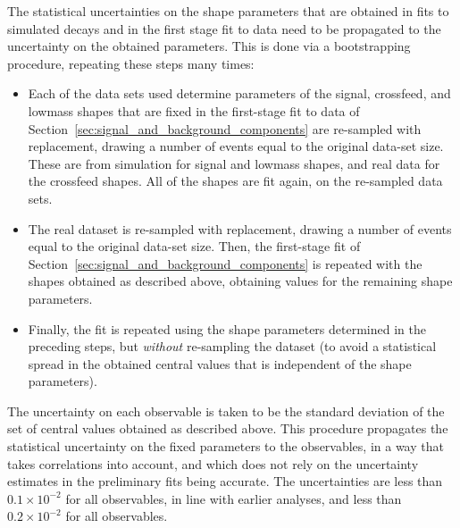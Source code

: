 The statistical uncertainties on the shape parameters that are obtained in fits to simulated decays and in the first stage fit to data need to be propagated to the uncertainty on the obtained parameters. This is done via a bootstrapping procedure, repeating these steps many times:
\begin{itemize}
    \item Each of the data sets used determine parameters of the signal, crossfeed, and lowmass shapes that are fixed in the first-stage fit to data of Section~\ref{sec:signal_and_background_components} are re-sampled with replacement, drawing a number of events equal to the original data-set size. These are from simulation for signal and lowmass shapes, and real data for the crossfeed shapes. All of the shapes are fit again, on the re-sampled data sets.
    \item The real dataset is re-sampled with replacement, drawing a number of events equal to the original data-set size. Then, the first-stage fit of Section~\ref{sec:signal_and_background_components} is repeated with the shapes obtained as described above, obtaining values for the remaining shape parameters.
    \item Finally, the \CP fit is repeated using the shape parameters determined in the preceding steps, but \emph{without} re-sampling the dataset (to avoid a statistical spread in the obtained central values that is independent of the shape parameters).
\end{itemize}
The uncertainty on each observable is taken to be the standard deviation of the set of central values obtained as described above. This procedure propagates the statistical uncertainty on the fixed parameters to the observables, in a way that takes correlations into account, and which does not rely on the uncertainty estimates in the preliminary fits being accurate. The uncertainties are less than $0.1\times 10^{-2}$ for all \DK observables, in line with earlier analyses, and less than $0.2\times 10^{-2}$ for all \Dpi observables.


